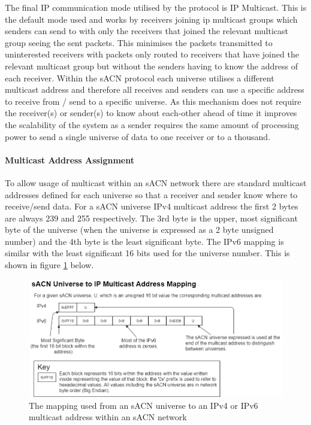 \documentclass[11pt,a4paper]{article}
\begin{document}
The final IP communication mode utilised by the protocol is IP Multicast. This is the default mode used and works by receivers joining ip multicast groups which senders can send to with only the receivers that joined the relevant multicast group seeing the sent packets. This minimises the packets transmitted to uninterested receivers with packets only routed to receivers that have joined the relevant multicast group but without the senders having to know the address of each receiver. Within the sACN protocol each universe utilises a different multicast address and therefore all receives and senders can use a specific address to receive from / send to a specific universe. As this mechanism does not require the receiver(s) or sender(s) to know about each-other ahead of time it improves the scalability of the system as a sender requires the same amount of processing power to send a single universe of data to one receiver or to a thousand. \\

\paragraph{Multicast Address Assignment}
To allow usage of multicast within an sACN network there are standard multicast addresses defined for each universe so that a receiver and sender know where to receive/send data. For a sACN universe IPv4 multicast address the first 2 bytes are always 239 and 255 respectively. The 3rd byte is the upper, most significant byte of the universe (when the universe is expressed as a 2 byte unsigned number) and the 4th byte is the least significant byte. The IPv6 mapping is similar with the least significant 16 bits used for the universe number. This is shown in figure \ref{UNI_IP_MAPPING} below.

\begin{figure}[H]
	\includegraphics[width=\textwidth]{IpMulticastMapping}
	\caption{The mapping used from an sACN universe to an IPv4 or IPv6 multicast address within an sACN network}
	\label{UNI_IP_MAPPING}
\end{figure}
\end{document}
